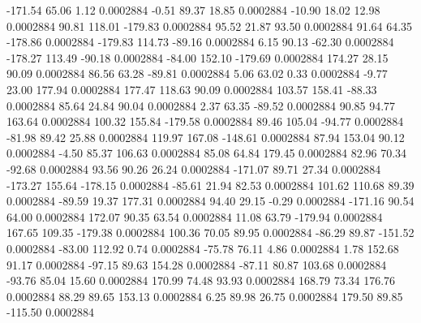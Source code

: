      -171.54       65.06        1.12     0.0002884
       -0.51       89.37       18.85     0.0002884
      -10.90       18.02       12.98     0.0002884
       90.81      118.01     -179.83     0.0002884
       95.52       21.87       93.50     0.0002884
       91.64       64.35     -178.86     0.0002884
     -179.83      114.73      -89.16     0.0002884
        6.15       90.13      -62.30     0.0002884
     -178.27      113.49      -90.18     0.0002884
      -84.00      152.10     -179.69     0.0002884
      174.27       28.15       90.09     0.0002884
       86.56       63.28      -89.81     0.0002884
        5.06       63.02        0.33     0.0002884
       -9.77       23.00      177.94     0.0002884
      177.47      118.63       90.09     0.0002884
      103.57      158.41      -88.33     0.0002884
       85.64       24.84       90.04     0.0002884
        2.37       63.35      -89.52     0.0002884
       90.85       94.77      163.64     0.0002884
      100.32      155.84     -179.58     0.0002884
       89.46      105.04      -94.77     0.0002884
      -81.98       89.42       25.88     0.0002884
      119.97      167.08     -148.61     0.0002884
       87.94      153.04       90.12     0.0002884
       -4.50       85.37      106.63     0.0002884
       85.08       64.84      179.45     0.0002884
       82.96       70.34      -92.68     0.0002884
       93.56       90.26       26.24     0.0002884
     -171.07       89.71       27.34     0.0002884
     -173.27      155.64     -178.15     0.0002884
      -85.61       21.94       82.53     0.0002884
      101.62      110.68       89.39     0.0002884
      -89.59       19.37      177.31     0.0002884
       94.40       29.15       -0.29     0.0002884
     -171.16       90.54       64.00     0.0002884
      172.07       90.35       63.54     0.0002884
       11.08       63.79     -179.94     0.0002884
      167.65      109.35     -179.38     0.0002884
      100.36       70.05       89.95     0.0002884
      -86.29       89.87     -151.52     0.0002884
      -83.00      112.92        0.74     0.0002884
      -75.78       76.11        4.86     0.0002884
        1.78      152.68       91.17     0.0002884
      -97.15       89.63      154.28     0.0002884
      -87.11       80.87      103.68     0.0002884
      -93.76       85.04       15.60     0.0002884
      170.99       74.48       93.93     0.0002884
      168.79       73.34      176.76     0.0002884
       88.29       89.65      153.13     0.0002884
        6.25       89.98       26.75     0.0002884
      179.50       89.85     -115.50     0.0002884
